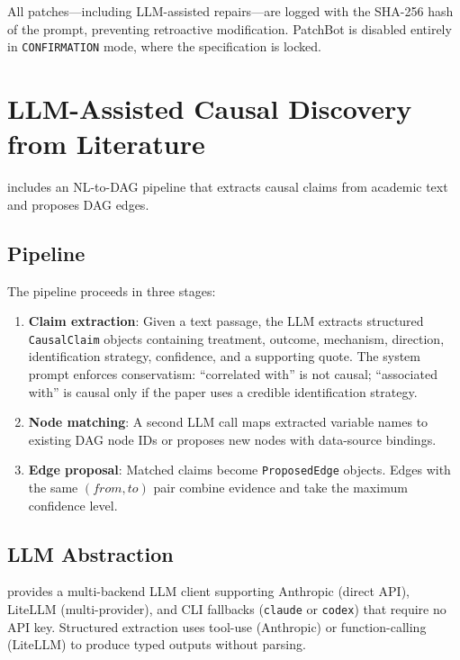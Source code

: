 \documentclass{article}
\begin{document}
All patches---including LLM-assisted repairs---are logged with the SHA-256 hash of the prompt, preventing retroactive modification. PatchBot is disabled entirely in \texttt{CONFIRMATION} mode, where the specification is locked.

\section{LLM-Assisted Causal Discovery from Literature}
\label{sec:llm}

\oc{} includes an NL-to-DAG pipeline that extracts causal claims from academic text and proposes DAG edges.

\subsection{Pipeline}

The pipeline proceeds in three stages:

\begin{enumerate}[leftmargin=*]
    \item \textbf{Claim extraction}: Given a text passage, the LLM extracts structured \texttt{CausalClaim} objects containing treatment, outcome, mechanism, direction, identification strategy, confidence, and a supporting quote. The system prompt enforces conservatism: ``correlated with'' is not causal; ``associated with'' is causal only if the paper uses a credible identification strategy.

    \item \textbf{Node matching}: A second LLM call maps extracted variable names to existing DAG node IDs or proposes new nodes with data-source bindings.

    \item \textbf{Edge proposal}: Matched claims become \texttt{ProposedEdge} objects. Edges with the same $(from, to)$ pair combine evidence and take the maximum confidence level.
\end{enumerate}

\subsection{LLM Abstraction}

\oc{} provides a multi-backend LLM client supporting Anthropic (direct API), LiteLLM (multi-provider), and CLI fallbacks (\texttt{claude} or \texttt{codex}) that require no API key. Structured extraction uses tool-use (Anthropic) or function-calling (LiteLLM) to produce typed outputs without parsing.
\end{document}
